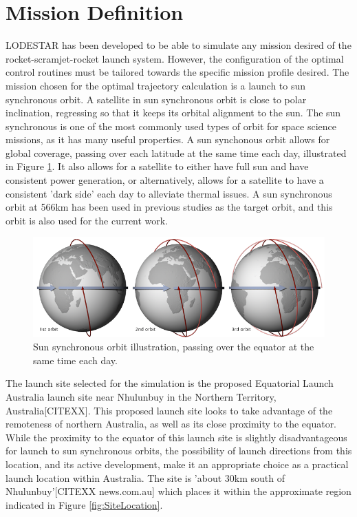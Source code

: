 \section{Mission Definition}\label{sec:mission}
LODESTAR has been developed to be able to simulate any mission desired of the rocket-scramjet-rocket launch system. However, the configuration of the optimal control routines must be tailored towards the specific mission profile desired.
The mission chosen for the optimal trajectory calculation is a launch to sun synchronous orbit. 
A satellite in sun synchronous orbit is close to polar inclination, regressing so that it keeps its orbital alignment to the sun. The sun synchronous is one of the most commonly used types of orbit for space science missions, as it has many useful properties\cite{Boain2004}. A sun synchonous orbit allows for global coverage, passing over each latitude at the same time each day, illustrated in Figure \ref{fig:SSO}. It also allows for a satellite to either have full sun and have consistent power generation, or alternatively, allows for a satellite to have a consistent 'dark side' each day to alleviate thermal issues\cite{Boain2004}. A sun synchronous orbit at 566km has been used in previous studies as the target orbit\cite{Preller2017b}, and this orbit is also used for the current work. 
\begin{figure}[ht]
\centering
\includegraphics[width=0.8\linewidth]{figures/4_LODESTAR/SSO}
\caption{Sun synchronous orbit illustration, passing over the equator at the same time each day\cite{NASASSO}.}
\label{fig:SSO}
\end{figure}

The launch site selected for the simulation is the proposed Equatorial Launch Australia launch site near Nhulunbuy in the Northern Territory, Australia[CITEXX]. This proposed launch site looks to take advantage of the remoteness of northern Australia, as well as its close proximity to the equator. While the proximity to the equator of this launch site is slightly disadvantageous for launch to sun synchronous orbits, the possibility of launch directions from this location, and its active development, make it an appropriate choice as a practical launch location within Australia. The site is 'about 30km south of Nhulunbuy'[CITEXX news.com.au] which places it within the approximate region indicated in Figure \ref{fig:SiteLocation}.

